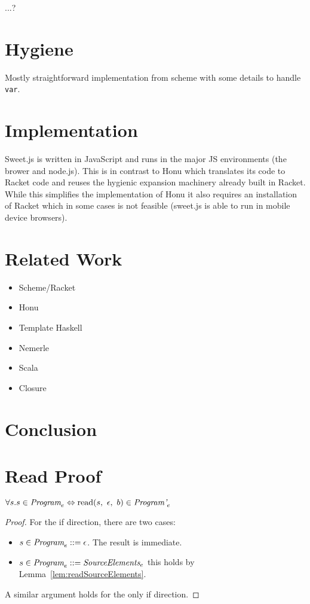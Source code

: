 \documentclass[preprint,10pt]{sigplanconf}
\begin{document}
...?

\section{Hygiene}
\label{sec-5}

Mostly straightforward implementation from scheme with some details to
handle \texttt{var}.
\section{Implementation}
\label{sec-6}
Sweet.js is written in JavaScript and runs in the major JS
environments (\ie the brower and node.js). This is in contrast to Honu
which translates its code to Racket code and reuses the hygienic
expansion machinery already built in Racket. While this simplifies
the implementation of Honu it also requires an installation of Racket
which in some cases is not feasible (\eg sweet.js is able to run in
mobile device browsers).
\section{Related Work}
\label{sec-7}

\begin{itemize}
\item Scheme/Racket
\item Honu
\item Template Haskell
\item Nemerle
\item Scala
\item Closure
\end{itemize}
\section{Conclusion}
\label{sec-8}

\appendix

\clearpage

\section{Read Proof}

\begin{theorem}\mbox{}

  \( \forall s. s \in \textit{Program}_{e} \Leftrightarrow 
  \textrm{read}(s,~\epsilon,~b) \in \textit{Program'}_{e} \)

\end{theorem}
\begin{proof}

  For the if direction, there are two cases:
  \begin{itemize}
  \item \( s \in \textit{Program}_{e} ::= \epsilon \). The result is immediate.

  \item \( s \in \textit{Program}_{e} ::= \textit{SourceElements}_{e} \)
    this holds by Lemma~\ref{lem:readSourceElements}.
  \end{itemize}

  A similar argument holds for the only if direction.
\end{proof}
\end{document}
